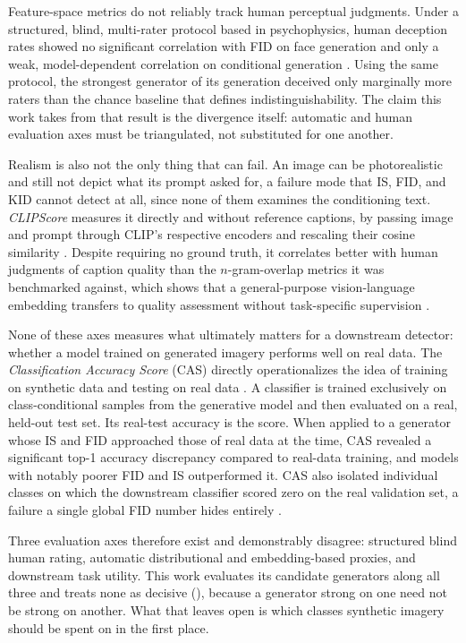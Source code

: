 Feature-space metrics do not reliably track human perceptual judgments. Under a structured, blind, multi-rater protocol based in psychophysics, human deception rates showed no significant correlation with FID on face generation and only a weak, model-dependent correlation on conditional generation \cite{zhouHYPEBenchmarkHuman2019}. Using the same protocol, the strongest generator of its generation deceived only marginally more raters than the chance baseline that defines indistinguishability. The claim this work takes from that result is the divergence itself: automatic and human evaluation axes must be triangulated, not substituted for one another.

Realism is also not the only thing that can fail. An image can be photorealistic and still not depict what its prompt asked for, a failure mode that IS, FID, and KID cannot detect at all, since none of them examines the conditioning text. \textit{CLIPScore} measures it directly and without reference captions, by passing image and prompt through CLIP's respective encoders and rescaling their cosine similarity \cite{hesselCLIPScoreReferencefreeEvaluation2021}. Despite requiring no ground truth, it correlates better with human judgments of caption quality than the $n$-gram-overlap metrics it was benchmarked against, which shows that a general-purpose vision-language embedding transfers to quality assessment without task-specific supervision \cite{hesselCLIPScoreReferencefreeEvaluation2021}.

None of these axes measures what ultimately matters for a downstream detector: whether a model trained on generated imagery performs well on real data. The \textit{Classification Accuracy Score} (CAS) directly operationalizes the idea of training on synthetic data and testing on real data \cite{ravuriClassificationAccuracyScore2019}. A classifier is trained exclusively on class-conditional samples from the generative model and then evaluated on a real, held-out test set. Its real-test accuracy is the score. When applied to a generator whose IS and FID approached those of real data at the time, CAS revealed a significant top-1 accuracy discrepancy compared to real-data training, and models with notably poorer FID and IS outperformed it. CAS also isolated individual classes on which the downstream classifier scored zero on the real validation set, a failure a single global FID number hides entirely \cite{ravuriClassificationAccuracyScore2019}.

Three evaluation axes therefore exist and demonstrably disagree: structured blind human rating, automatic distributional and embedding-based proxies, and downstream task utility. This work evaluates its candidate generators along all three and treats none as decisive (), because a generator strong on one need not be strong on another. What that leaves open is which classes synthetic imagery should be spent on in the first place.

